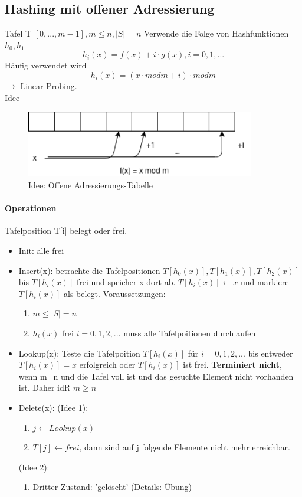\subsection{Hashing mit offener Adressierung}
Tafel T $ [0, ..., m-1], m \leq n, |S| = n $
Verwende die Folge von Hashfunktionen $ h_0, h_1 $ 
$$ h_i(x) = f(x) + i \cdot g(x), i = 0,1,...$$
Häufig verwendet wird
$$ h_i(x) = (x \cdot mod m + i)\cdot mod m $$
$\rightarrow$ Linear Probing.\\
Idee
\begin{figure}[h]
    \begin{center}
        \includegraphics[width=10cm]{offeneadressierung.png}
        \caption{Idee: Offene Adressierungs-Tabelle}
        \label{fig:}
    \end{center}
\end{figure}

\paragraph{Operationen} Tafelposition T[i] belegt oder frei.
\begin{itemize}
    \item Init: alle frei
    \item Insert(x): betrachte die Tafelpositionen $T[h_0(x)], T[h_1(x)], T[h_2(x)]$ bis $ T[h_i(x)] $ frei und speicher x dort ab.
    $ T[h_i(x)] \leftarrow x $ und markiere $ T[h_i(x)]$ als belegt. Voraussetzungen:
    \begin{enumerate}
        \item $ m \leq |S| = n $
        \item $ h_i(x) $ frei $ i = 0,1,2,... $ muss alle Tafelpoitionen durchlaufen
    \end{enumerate}
    \item Lookup(x): Teste die Tafelpoition $ T[h_i(x)] $ für $ i=0,1,2,... $ bis entweder $ T[h_i(x)] = x $ erfolgreich oder $ T[h_i(x)] $ ist frei. \textbf{Terminiert nicht}, wenn m=n und die Tafel voll ist und das gesuchte Element nicht vorhanden ist. Daher idR $ m \geq n $
    \item Delete(x): (Idee 1):
    \begin{enumerate}
        \item $ j \leftarrow Lookup(x) $ 
        \item $ T[j] \leftarrow frei $, dann sind auf j folgende Elemente nicht mehr erreichbar.
    \end{enumerate}
    (Idee 2):
    \begin{enumerate}
        \item Dritter Zustand: 'gelöscht' (Details: Übung)
    \end{enumerate}
\end{itemize}



